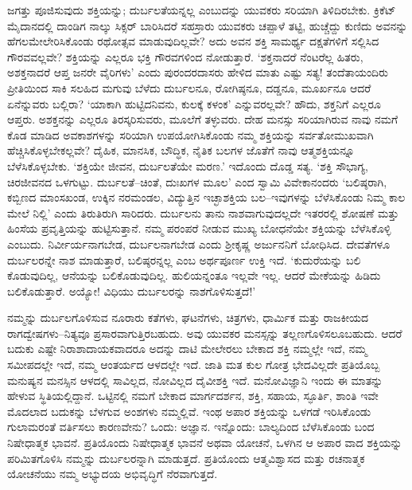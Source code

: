 \vskip -8pt

ಜಗತ್ತು ಪೂಜಿಸುವುದು ಶಕ್ತಿಯನ್ನು; ದುರ್ಬಲತೆಯನ್ನಲ್ಲ ಎಂಬುದನ್ನು ಯುವಕರು ಸರಿಯಾಗಿ ತಿಳಿದಿರಬೇಕು. ಕ್ರಿಕೆಟ್ ಮೈದಾನದಲ್ಲಿ ದಾಂಡಿಗ ನಾಲ್ಕು ಸಿಕ್ಸರ್ ಬಾರಿಸಿದರೆ ಸಹಸ್ರಾರು ಯುವಕರು ಚಪ್ಪಾಳೆ ತಟ್ಟಿ, ಹುಚ್ಚೆದ್ದು ಕುಣಿದು ಅವನನ್ನು ಹೆಗಲಮೇಲೇರಿಸಿಕೊಂಡು ರಥೋತ್ಸವ ಮಾಡುವು\-ದಿಲ್ಲವೇ? ಅದು ಅವನ ಶಕ್ತಿ ಸಾಮರ್ಥ್ಯ ದಕ್ಷತೆಗಳಿಗೆ ಸಲ್ಲಿಸಿದ ಗೌರವವಲ್ಲವೇ? ಶಕ್ತಿಯನ್ನು ಎಲ್ಲರೂ ಭಕ್ತಿ ಗೌರವಗಳಿಂದ ನೋಡುತ್ತಾರೆ. ‘ಶಕ್ತನಾದರೆ ನೆಂಟರೆಲ್ಲ ಹಿತರು, ಅಶಕ್ತನಾದರೆ ಆಪ್ತ ಜನರೇ ವೈರಿಗಳು’ ಎಂದು ಪುರಂದರದಾಸರು ಹೇಳಿದ ಮಾತು ಎಷ್ಟು ಸತ್ಯ! ತಂದೆತಾಯಂದಿರು ಪ್ರೀತಿಯಿಂದ ಸಾಕಿ ಸಲಹಿದ ಮಗುವು ಬೆಳೆದು ದುರ್ಬಲನೂ, ರೋಗಿಷ್ಠನೂ, ದಡ್ಡನೂ, ಮೂರ್ಖನೂ ಆದರೆ ಏನೆನ್ನುವರು ಬಲ್ಲಿರಾ? ‘ಯಾಕಾಗಿ ಹುಟ್ಟಿದನಿವನು, ಕುಲಕ್ಕೆ ಕಳಂಕ’ ಎನ್ನುವರಲ್ಲವೇ? ಹೌದು, ಶಕ್ತನಿಗೆ ಎಲ್ಲರೂ ಆಪ್ತರು. ಅಶಕ್ತನನ್ನು ಎಲ್ಲರೂ ತಿರಸ್ಕರಿಸುವರು, ಮೂಲೆಗೆ ತಳ್ಳುವರು. ದೇಹ ಮನಸ್ಸು ಸರಿಯಾಗಿರುವ ನಾವು ನಮಗೆ ಕೊಡ ಮಾಡಿದ ಅವಕಾಶಗಳನ್ನು ಸರಿಯಾಗಿ ಉಪಯೋಗಿಸಿಕೊಂಡು ನಮ್ಮ ಶಕ್ತಿಯನ್ನು ಸರ್ವತೋಮುಖವಾಗಿ ಹೆಚ್ಚಿಸಿಕೊಳ್ಳಬೇಕಲ್ಲವೇ? ದೈಹಿಕ, ಮಾನಸಿಕ, ಬೌದ್ಧಿಕ, ನೈತಿಕ ಬಲಗಳ ಜೊತೆಗೆ ನಾವು ಆತ್ಮಶಕ್ತಿಯನ್ನೂ ಬೆಳೆಸಿಕೊಳ್ಳಬೇಕು. ‘ಶಕ್ತಿಯೇ ಜೀವನ, ದುರ್ಬಲತೆಯೇ ಮರಣ.’ ಇದೊಂದು ದೊಡ್ಡ ಸತ್ಯ. ‘ಶಕ್ತಿ ಸೌಭಾಗ್ಯ, ಚಿರಜೀವನದ ಒಳಗುಟ್ಟು. ದುರ್ಬಲತೆ–ಚಿಂತೆ, ದುಃಖಗಳ ಮೂಲ’ ಎಂದ ಸ್ವಾಮಿ ವಿವೇಕಾನಂದರು ‘ಬಲಿಷ್ಠರಾಗಿ, ಕಬ್ಬಿಣದ ಮಾಂಸಖಂಡ, ಉಕ್ಕಿನ ನರಮಂಡಲ, ವಿದ್ಯುತ್ತಿನ ಇಚ್ಛಾಶಕ್ತಿಯ ಬಲ–ಇವುಗಳನ್ನು ಬೆಳೆಸಿಕೊಂಡು ನಿಮ್ಮ ಕಾಲ ಮೇಲೆ ನಿಲ್ಲಿ’ ಎಂದು ತಿರುತಿರುಗಿ ಸಾರಿದರು. ದುರ್ಬಲನು ತಾನು ನಾಶವಾಗುವುದಲ್ಲದೇ ಇತರರಲ್ಲಿ ಶೋಷಣೆ ಮತ್ತು ಹಿಂಸೆಯ ಪ್ರವೃತ್ತಿಯನ್ನು ಹುಟ್ಟಿಸುತ್ತಾನೆ. ನಮ್ಮ ಪರಂಪರೆ ನೀಡುವ ಮುಖ್ಯ ಬೋಧನೆಯೇ ಶಕ್ತಿಯನ್ನು ಬೆಳೆಸಿಕೊಳ್ಳಿ ಎಂಬುದು. ನಿರ್ವೀರ್ಯನಾಗಬೇಡ, ದುರ್ಬಲನಾಗಬೇಡ ಎಂದು ಶ‍್ರೀಕೃಷ್ಣ ಅರ್ಜುನನಿಗೆ ಬೋಧಿಸಿದ. ದೇವತೆಗಳೂ ದುರ್ಬಲರನ್ನೇ ನಾಶ ಮಾಡುತ್ತಾರೆ, ಬಲಿಷ್ಠರನ್ನಲ್ಲ ಎಂಬ ಅರ್ಥಪೂರ್ಣ ಉಕ್ತಿ ಇದೆ. ‘ಕುದುರೆಯನ್ನು ಬಲಿ ಕೊಡುವುದಿಲ್ಲ, ಆನೆಯನ್ನು ಬಲಿಕೊಡುವುದಿಲ್ಲ. ಹುಲಿಯನ್ನಂತೂ ಇಲ್ಲವೇ ಇಲ್ಲ. ಆದರೆ ಮೇಕೆಯನ್ನು ಹಿಡಿದು ಬಲಿಕೊಡುತ್ತಾರೆ. ಅಯ್ಯೋ! ವಿಧಿಯು ದುರ್ಬಲರನ್ನು ನಾಶಗೊಳಿಸುತ್ತದೆ!’

ನಮ್ಮನ್ನು ದುರ್ಬಲಗೊಳಿಸುವ ನೂರಾರು ಕತೆಗಳು, ಘಟನೆಗಳು, ಚಿತ್ರಗಳು, ಧಾರ್ಮಿಕ ಮತ್ತು ರಾಜಕೀಯದ ರಾಗದ್ವೇಷಗಳು–ನಿತ್ಯವೂ ಪ್ರಸಾರವಾಗುತ್ತಿರಬಹುದು. ಅವು ಯುವಕರ ಮನಸ್ಸನ್ನು ತಲ್ಲಣಗೊಳಿಸಲೂಬಹುದು. ಆದರೆ ಬದುಕು ಎಷ್ಟೇ ನಿರಾಶಾದಾಯಕವಾದರೂ ಅದನ್ನು ದಾಟಿ ಮೇಲೇರಲು ಬೇಕಾದ ಶಕ್ತಿ ನಮ್ಮಲ್ಲೇ ಇದೆ, ನಮ್ಮ ಸಮೀಪದಲ್ಲೇ ಇದೆ, ನಮ್ಮ ಆಂತರ್ಯದ ಆಳದಲ್ಲೇ ಇದೆ. ಜಾತಿ ಮತ ಕುಲ ಗೋತ್ರ ಭೇದವಿಲ್ಲದೇ ಪ್ರತಿಯೊಬ್ಬ ಮನುಷ್ಯನ ಮನಸ್ಸಿನ ಆಳದಲ್ಲಿ ಸಾವಿಲ್ಲದ, ನೋವಿಲ್ಲದ ದೈವೀಶಕ್ತಿ ಇದೆ. ಮನೋವಿಜ್ಞಾನಿ ಇಂದು ಈ ಮಾತನ್ನು ಹೇಳುವ ಸ್ಥಿತಿಯಲ್ಲಿದ್ದಾನೆ. ಒಟ್ಟಿನಲ್ಲಿ ನಮಗೆ ಬೇಕಾದ ಮಾರ್ಗದರ್ಶನ, ಶಕ್ತಿ, ಸಹಾಯ, ಸ್ಫೂರ್ತಿ, ಶಾಂತಿ ಇವೇ ಮೊದಲಾದ ಬದುಕನ್ನು ಬೆಳಗುವ ಅಂಶಗಳು ನಮ್ಮಲ್ಲಿವೆ. ಇಂಥ ಅಪಾರ ಶಕ್ತಿಯನ್ನು ಒಳಗಡೆ ಇರಿಸಿಕೊಂಡು ಗುಲಾಮರಂತೆ ವರ್ತಿಸಲು ಕಾರಣವೇನು? ಒಂದು: ಅಜ್ಞಾನ. ಇನ್ನೊಂದು: ಬಾಲ್ಯದಿಂದ ಬೆಳೆಸಿಕೊಂಡು ಬಂದ ನಿಷೇಧಾತ್ಮಕ ಭಾವನೆ. ಪ್ರತಿಯೊಂದು ನಿಷೇಧಾತ್ಮಕ ಭಾವನೆ ಅಥವಾ ಯೋಚನೆ, ಒಳಗಿನ ಆ ಅಪಾರ ವಾದ ಶಕ್ತಿಯನ್ನು ಪರಿಮಿತಗೊಳಿಸಿ ನಮ್ಮನ್ನು ದುರ್ಬಲರನ್ನಾಗಿ ಮಾಡುತ್ತದೆ. ಪ್ರತಿಯೊಂದು ಆತ್ಮವಿಶ್ವಾಸದ ಮತ್ತು ರಚನಾತ್ಮಕ ಯೋಚನೆಯು ನಮ್ಮ ಅಭ್ಯುದಯ ಅಭಿವೃದ್ಧಿಗೆ ನೆರವಾಗುತ್ತದೆ.

